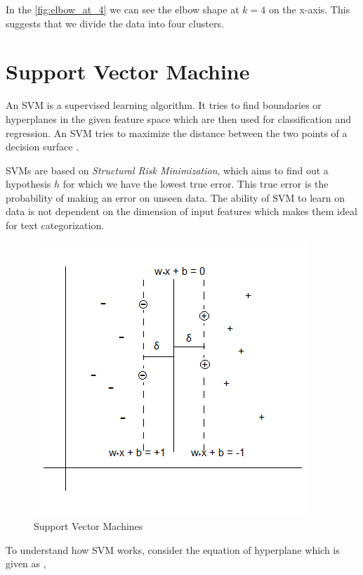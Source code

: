 In the \ref{fig:elbow_at_4} we can see the elbow shape at $k=4$ on the x-axis. This suggests that we divide the data into four clusters.

\section{Support Vector Machine}\label{sec:svm}
An \gls{SVM} is a supervised learning algorithm. It tries to find boundaries or hyperplanes in the given feature space which are then used for classification and regression. An \gls{SVM} tries to maximize the distance between the two points of a decision surface \cite{manning2010introduction}.

\glspl{SVM} are based on \textit{Structural Risk Minimization}, which aims to find out a hypothesis $h$ for which we have the lowest true error. This true error is the probability of making an error on unseen data. The ability of \gls{SVM} to learn on data is not dependent on the dimension of input features which makes them ideal for text categorization. 

\begin{figure}[!ht]
    \centering
    \includegraphics{pics/SVM.png}
    \captionsetup{justification=centering,margin=2cm}
    \caption{Support Vector Machines}
    \label{fig:svm}
\end{figure}

To understand how \gls{SVM} works, consider the equation of hyperplane which is given as \cite{friedman2001elements},

